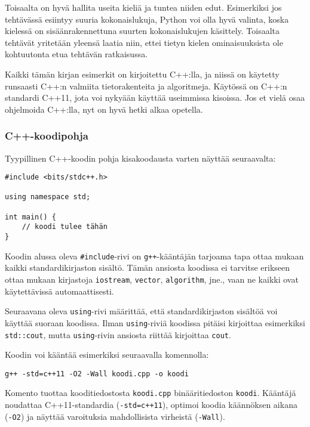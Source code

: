 Toisaalta on hyvä hallita useita kieliä
ja tuntea niiden edut.
Esimerkiksi jos tehtävässä esiintyy
suuria kokonaislukuja,
Python voi olla hyvä valinta,
koska kielessä on sisäänrakennettuna
suurten kokonaislukujen käsittely.
Toisaalta tehtävät yritetään yleensä laatia niin,
ettei tietyn kielen ominaisuuksista
ole kohtuutonta etua tehtävän ratkaisussa.

Kaikki tämän kirjan esimerkit on kirjoitettu C++:lla,
ja niissä on käytetty runsaasti C++:n valmiita 
tietorakenteita ja algoritmeja.
Käytössä on C++:n standardi C++11,
jota voi nykyään käyttää useimmissa kisoissa.
Jos et vielä osaa ohjelmoida C++:lla,
nyt on hyvä hetki alkaa opetella.

\subsubsection{C++-koodipohja}

Tyypillinen C++-koodin pohja kisakoodausta varten
näyttää seuraavalta:

\begin{lstlisting}
#include <bits/stdc++.h>

using namespace std;

int main() {
    // koodi tulee tähän
}
\end{lstlisting}

\noindent
Koodin alussa oleva \texttt{\#include}-rivi
on \texttt{g++}-kääntäjän tarjoama tapa
ottaa mukaan kaikki standardikirjaston sisältö.
Tämän ansiosta koodissa ei tarvitse erikseen
ottaa mukaan kirjastoja \texttt{iostream},
\texttt{vector}, \texttt{algorithm}, jne.,
vaan ne kaikki ovat käytettävissä automaattisesti.

Seuraavana oleva \texttt{using}-rivi määrittää,
että standardikirjaston sisältöä voi käyttää
suoraan koodissa.
Ilman \texttt{using}-riviä koodissa pitäisi
kirjoittaa esimerkiksi \texttt{std::cout},
mutta \texttt{using}-rivin ansiosta riittää
kirjoittaa \texttt{cout}.

Koodin voi kääntää esimerkiksi
seuraavalla komennolla:

\begin{lstlisting}
g++ -std=c++11 -O2 -Wall koodi.cpp -o koodi
\end{lstlisting}

Komento tuottaa kooditiedostosta \texttt{koodi.cpp}
binääritiedoston \texttt{koodi}.
Kääntäjä noudattaa C++11-standardia
(\texttt{-std=c++11}),
optimoi koodia käännöksen aikana (\texttt{-O2})
ja näyttää varoituksia
mahdollisista virheistä (\texttt{-Wall}).

